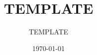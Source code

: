 \documentclass[12pt, a4paper]{article}
\title{TEMPLATE}
\author{TEMPLATE}
\date{\today}
\begin{document}


\tableofcontents
\listoffigures
\pagebreak





\end{document}
